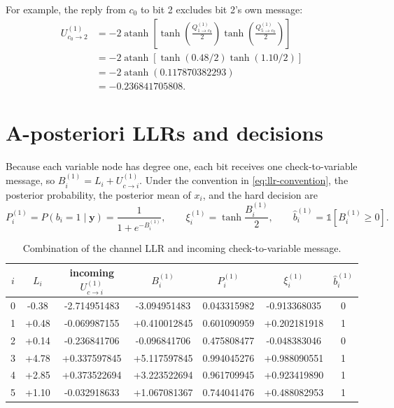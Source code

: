 \documentclass[11pt]{article}
\newcommand{\atanh}{\operatorname{atanh}}
\begin{document}
For example, the reply from \(c_0\) to bit 2 excludes bit 2's own message:
\begin{align}
U_{c_0\to2}^{(1)}
&=-2\atanh\!\left[
  \tanh\!\left(\frac{Q_{1\to c_0}^{(1)}}{2}\right)
  \tanh\!\left(\frac{Q_{5\to c_0}^{(1)}}{2}\right)
  \right]\\
&=-2\atanh\!\left[
  \tanh(0.48/2)\tanh(1.10/2)
  \right]\\
&=-2\atanh(0.117870382293)\\
&=-0.236841705808.
\end{align}

\section{A-posteriori LLRs and decisions}

Because each variable node has degree one, each bit receives one
check-to-variable message, so \(B_i^{(1)}=L_i+U_{c\to i}^{(1)}\).  Under the
convention in \eqref{eq:llr-convention}, the posterior probability, the
posterior mean of \(x_i\), and the hard decision are
\begin{equation}
P_i^{(1)}=P(b_i=1\mid\boldsymbol y)
=\frac{1}{1+e^{-B_i^{(1)}}},
\qquad
\xi_i^{(1)}=\tanh\!\frac{B_i^{(1)}}{2},
\qquad
\widehat b_i^{(1)}=\mathbb{1}[B_i^{(1)}\geq0].
\label{eq:final-quantities}
\end{equation}

\begin{table}[htbp]
\centering
\small
\caption{Combination of the channel LLR and incoming check-to-variable message.}
\label{tab:posterior}
\setlength{\tabcolsep}{5.0pt}
\begin{tabular}{
  c
  S[table-format=+1.2]
  S[table-format=+1.9]
  S[table-format=+1.9]
  S[table-format=1.9]
  S[table-format=+1.9]
  c
}
\toprule
{$i$} & {$L_i$} & {incoming $U_{c\to i}^{(1)}$} & {$B_i^{(1)}$}
& {$P_i^{(1)}$} & {$\xi_i^{(1)}$} & {$\widehat b_i^{(1)}$} \\
 & -0.38 & -2.714951483 & -3.094951483 & 0.043315982 & -0.913368035 & 0 \\
1 & +0.48 & -0.069987155 & +0.410012845 & 0.601090959 & +0.202181918 & 1 \\
2 & +0.14 & -0.236841706 & -0.096841706 & 0.475808477 & -0.048383046 & 0 \\
3 & +4.78 & +0.337597845 & +5.117597845 & 0.994045276 & +0.988090551 & 1 \\
4 & +2.85 & +0.373522694 & +3.223522694 & 0.961709945 & +0.923419890 & 1 \\
5 & +1.10 & -0.032918633 & +1.067081367 & 0.744041476 & +0.488082953 & 1 \\
\bottomrule
\end{tabular}
\end{table}
\end{document}

